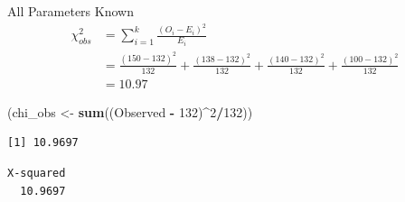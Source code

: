 \documentclass[
  ignorenonframetext,
]{beamer}
\newenvironment{Shaded}{\begin{snugshade}}{\end{snugshade}}
\newcommand{\AttributeTok}[1]{\textcolor[rgb]{0.13,0.29,0.53}{#1}}
\newcommand{\CommentTok}[1]{\textcolor[rgb]{0.56,0.35,0.01}{\textit{#1}}}
\newcommand{\DecValTok}[1]{\textcolor[rgb]{0.00,0.00,0.81}{#1}}
\newcommand{\FunctionTok}[1]{\textcolor[rgb]{0.13,0.29,0.53}{\textbf{#1}}}
\newcommand{\NormalTok}[1]{#1}
\newcommand{\OtherTok}[1]{\textcolor[rgb]{0.56,0.35,0.01}{#1}}
\newcommand{\SpecialCharTok}[1]{\textcolor[rgb]{0.81,0.36,0.00}{\textbf{#1}}}
\begin{document}
\begin{frame}[fragile]{All Parameters Known}
\label{all-parameters-known-2}
\[
\begin{aligned}
\chi^2_{obs} &= \sum_{i=1}^k\frac{(O_i - E_i)^2}{E_i}\\ & = \frac{(150 - 132)^2}{132} + \frac{(138 - 132)^2}{132} + \frac{(140 - 132)^2}{132} + \frac{(100 - 132)^2}{132}\\ &= 10.97
\end{aligned}
\]

\begin{Shaded}
\begin{Highlighting}[]
\NormalTok{(chi\_obs }\OtherTok{\textless{}{-}} \FunctionTok{sum}\NormalTok{((Observed }\SpecialCharTok{{-}} \DecValTok{132}\NormalTok{)}\SpecialCharTok{\^{}}\DecValTok{2}\SpecialCharTok{/}\DecValTok{132}\NormalTok{))}
\end{Highlighting}
\end{Shaded}

\begin{verbatim}
[1] 10.9697
\end{verbatim}

\begin{Shaded}
\end{Shaded}

\begin{verbatim}
X-squared 
  10.9697 
\end{verbatim}
\end{frame}
\end{document}
